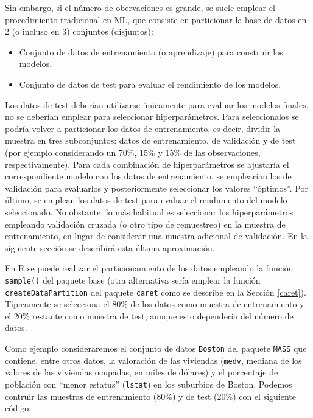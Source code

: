 \documentclass[]{book}
\theoremstyle{break}
\theoremstyle{definition}
\theoremstyle{definition}
\theoremstyle{definition}
\theoremstyle{remark}
\begin{document}
Sin embargo, si el número de obervaciones es grande, se suele emplear el
procedimiento tradicional en ML, que consiste en particionar la base de
datos en 2 (o incluso en 3) conjuntos (disjuntos):

\begin{itemize}
\item
  Conjunto de datos de entrenamiento (o aprendizaje) para construir los
  modelos.
\item
  Conjunto de datos de test para evaluar el rendimiento de los modelos.
\end{itemize}

Los datos de test deberían utilizarse únicamente para evaluar los
modelos finales, no se deberían emplear para seleccionar
hiperparámetros. Para seleccionalos se podría volver a particionar los
datos de entrenamiento, es decir, dividir la muestra en tres
subconjuntos: datos de entrenamiento, de validación y de test (por
ejemplo considerando un 70\%, 15\% y 15\% de las observaciones,
respectivamente). Para cada combinación de hiperparámetros se ajustaría
el correspondiente modelo con los datos de entrenamiento, se emplearían
los de validación para evaluarlos y posteriormente seleccionar los
valores ``óptimos''. Por último, se emplean los datos de test para
evaluar el rendimiento del modelo seleccionado. No obstante, lo más
habitual es seleccionar los hiperparámetros empleando validación cruzada
(o otro tipo de remuestreo) en la muestra de entrenamiento, en lugar de
considerar una muestra adicional de validación. En la siguiente sección
se describirá esta última aproximación.

En R se puede realizar el particionamiento de los datos empleando la
función \texttt{sample()} del paquete base (otra alternativa sería
emplear la función \texttt{createDataPartition} del paquete
\texttt{caret} como se describe en la Sección \ref{caret}). Típicamente
se selecciona el 80\% de los datos como muestra de entrenamiento y el
20\% restante como muestra de test, aunque esto dependería del número de
datos.

Como ejemplo consideraremos el conjunto de datos \texttt{Boston} del
paquete \texttt{MASS} que contiene, entre otros datos, la valoración de
las viviendas (\texttt{medv}, mediana de los valores de las viviendas
ocupadas, en miles de dólares) y el porcentaje de población con ``menor
estatus'' (\texttt{lstat}) en los suburbios de Boston. Podemos contruir
las muestras de entrenamiento (80\%) y de test (20\%) con el siguiente
código:
\end{document}
